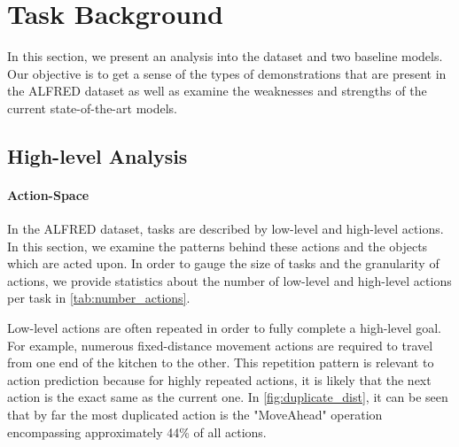 \documentclass[11pt,a4paper]{article}
\begin{document}
\section{Task Background}
In this section, we present an analysis into the dataset and two baseline models. Our objective is to get a sense of the types of demonstrations that are present in the ALFRED dataset as well as examine the weaknesses and strengths of the current state-of-the-art models.

\subsection{High-level Analysis}

\paragraph{Action-Space} In the ALFRED dataset, tasks are described by low-level and high-level actions. In this section, we examine the patterns behind these actions and the objects which are acted upon. In order to gauge the size of tasks and the granularity of actions, we provide statistics about the number of low-level and high-level actions per task in \autoref{tab:number_actions}.


\begin{table}[]
    \centering
    \caption{Statistics on the number of low-level and high-level actions for the splits of the data.}
    \label{tab:number_actions}
\end{table}

Low-level actions are often repeated in order to fully complete a high-level goal. For example, numerous fixed-distance movement actions are required to travel from one end of the kitchen to the other. This repetition pattern is relevant to action prediction because for highly repeated actions, it is likely that the next action is the exact same as the current one. In \autoref{fig:duplicate_dist}, it can be seen that by far the most duplicated action is the "MoveAhead" operation encompassing approximately 44\% of all actions.
\end{document}
